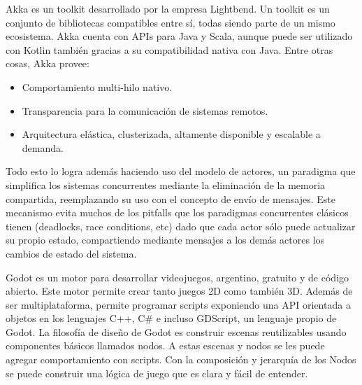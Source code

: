 
Akka es un toolkit desarrollado por la empresa Lightbend. Un toolkit es un conjunto de 
bibliotecas compatibles entre sí, todas siendo parte de un mismo ecosistema. 
Akka cuenta con APIs para Java y Scala, aunque puede ser utilizado con Kotlin también 
gracias a su compatibilidad nativa con Java. Entre otras cosas, Akka provee:

\begin{itemize}
    \item Comportamiento multi-hilo nativo.
    \item Transparencia para la comunicación de sistemas remotos.
    \item Arquitectura elástica, clusterizada, altamente disponible y escalable a demanda.
\end{itemize}

Todo esto lo logra además haciendo uso del modelo de actores, un paradigma que simplifica 
los sistemas concurrentes mediante la eliminación de la memoria compartida, reemplazando su uso 
con el concepto de envío de mensajes. Este mecanismo evita muchos de los pitfalls que los paradigmas 
concurrentes clásicos tienen (deadlocks, race conditions, etc) dado que cada actor sólo puede 
actualizar su propio estado, compartiendo mediante mensajes a los demás actores los cambios de 
estado del sistema.

Godot es un motor para desarrollar videojuegos, argentino, gratuito y de código abierto. 
Este motor permite crear tanto juegos 2D como también 3D. Además de ser multiplataforma, 
permite programar scripts exponiendo una API orientada a objetos en los lenguajes C++, C\# 
e incluso GDScript, un lenguaje propio de Godot.
La filosofía de diseño de Godot es construir escenas reutilizables usando componentes básicos 
llamados nodos. 
A estas escenas y nodos se les puede agregar comportamiento con scripts. 
Con la composición y jerarquía de los Nodos se puede construir una lógica de juego que es clara 
y fácil de entender.


